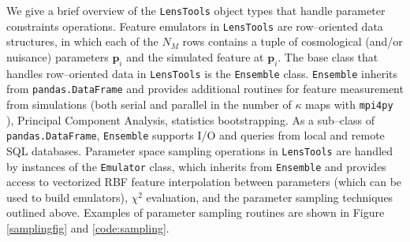 \documentclass[5p]{elsarticle}
\newcommand{\bb}[1]{\mathbf{#1}}
\newcommand{\ttt}[1]{\texttt{#1}}
\newcommand{\LT}{\texttt{LensTools} }
\begin{document}
We give a brief overview of the \LT object types that handle parameter constraints operations. Feature emulators in \LT are row--oriented data structures, in which each of the $N_M$ rows contains a tuple of cosmological (and/or nuisance) parameters $\bb{p}_i$ and the simulated feature at $\bb{p}_i$. The base class that handles row--oriented data in \LT is the \ttt{Ensemble} class. \ttt{Ensemble} inherits from \ttt{pandas.DataFrame} \citep{pandas} and provides additional routines for feature measurement from simulations (both serial and parallel in the number of $\kappa$ maps with \ttt{mpi4py} \citep{mpi4py}), Principal Component Analysis, statistics bootstrapping. As a sub--class of \ttt{pandas.DataFrame}, \ttt{Ensemble} supports I/O and queries from local and remote SQL databases. Parameter space sampling operations in \LT are handled by instances of the \ttt{Emulator} class, which inherits from \ttt{Ensemble} and provides access to vectorized RBF feature interpolation between parameters (which can be used to build emulators), $\chi^2$ evaluation, and the parameter sampling techniques outlined above. Examples of parameter sampling routines are shown in Figure \ref{samplingfig} and \ref{code:sampling}.          
\end{document}
